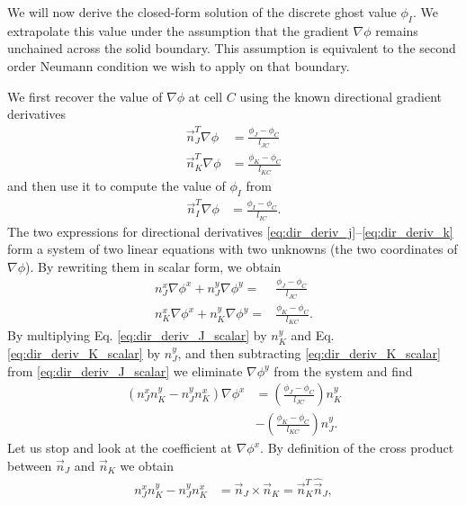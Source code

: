 \documentclass[preprint,nocopyrightspace]{sigplanconf}
\begin{document}
We will now derive the closed-form solution of the discrete ghost
value $\phi_I$. We extrapolate this value under the assumption that
the gradient $\nabla \phi$ remains unchained across the solid
boundary. This assumption is equivalent to the second order Neumann
condition we wish to apply on that boundary.

We first recover the value of $\nabla \phi$ at cell $C$ using the
known directional gradient derivatives
\begin{align}
\vec n_J^T \nabla \phi &= \frac{\phi_J - \phi_C}{l_{JC}} \label{eq:dir_deriv_j}\\
\vec n_K^T \nabla \phi &= \frac{\phi_K - \phi_C}{l_{KC}} \label{eq:dir_deriv_k}
\end{align}
and then use it to compute the value of $\phi_I$ from
\begin{align}
\vec n_I^T \nabla \phi &= \frac{\phi_I - \phi_C}{l_{IC}}. \label{eq:dir_deriv_i}
\end{align}
The two expressions for directional derivatives
\eqref{eq:dir_deriv_j}--\eqref{eq:dir_deriv_k} form a system of two
linear equations with two unknowns (the two coordinates of $\nabla
\phi$). By rewriting them in scalar form, we obtain
\begin{align}
n_J^x \nabla \phi^x + n_J^y \nabla \phi^y =& \frac{\phi_J-\phi_C}{l_{JC}} \label{eq:dir_deriv_J_scalar}\\
n_K^x \nabla \phi^x + n_K^y \nabla \phi^y =& \frac{\phi_K-\phi_C}{l_{KC}}. \label{eq:dir_deriv_K_scalar}
\end{align}
By multiplying Eq. \eqref{eq:dir_deriv_J_scalar} by $n_K^y$ and
Eq. \eqref{eq:dir_deriv_K_scalar} by $n_J^y$, and then subtracting
\eqref{eq:dir_deriv_K_scalar} from \eqref{eq:dir_deriv_J_scalar} we
eliminate $\nabla \phi^y$ from the system and find
\begin{equation}
  \begin{split}
    \left(n_J^x n_K^y - n_J^y n_K^x \right) \nabla \phi^x &=
    \left(\frac{\phi_J-\phi_C}{l_{JC}} \right)n_K^y 
    \\
    &- 
    \left(\frac{\phi_K-\phi_C}{l_{KC}} \right) n_J^y. 
  \end{split}
\end{equation}
Let us stop and look at the coefficient at $\nabla \phi^x$. By
definition of the cross product between $\vec n_J$ and
$\vec n_K$ we obtain
\begin{equation}
  \begin{split}
    n_J^x n_K^y - n_J^y n_K^x &= \vec n_J \times \vec n_K = \vec n_K^T\hat{\vec n }_J,
  \end{split}
\end{equation}
\end{document}
